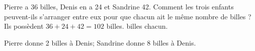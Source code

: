 Pierre a 36 billes, Denis en a 24 et Sandrine 42. Comment les trois
 enfants peuvent-ils s'arranger entre eux pour que chacun ait le même
 nombre de billes ?
Ils possèdent $36+24+42=102$ billes. billes chacun.
\par Pierre donne 2 billes à Denis; Sandrine donne 8 billes à Denis.
